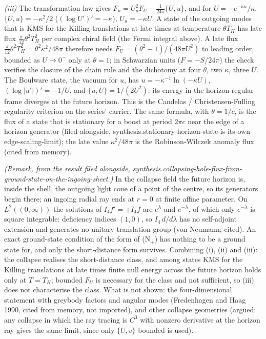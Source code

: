 \emph{(iii)} The transformation law gives $F_{u} = U_{u}^{2}F_{U} - \tfrac{1}{24\pi}\{U, u\}$, and for $U = -e^{-\kappa u}/\kappa$, $\{U, u\} = -\kappa^{2}/2$ ($(\log U')' = -\kappa$), $U_{u} = -\kappa U$. A state of the outgoing modes that is KMS for the Killing translations at late times at temperature $\theta T_{H}$ has late flux $\tfrac{\pi}{12}\theta^{2}T_{H}^{2}$ per complex chiral field (the Fermi integral above). A late flux $\tfrac{\pi}{12}\theta^{2}T_{H}^{2} = \theta^{2}\kappa^{2}/48\pi$ therefore needs $F_{U} = (\theta^{2} - 1)/(48\pi U^{2})$ to leading order, bounded as $U \to 0^{-}$ only at $\theta = 1$; in Schwarzian units ($F = -S/24\pi$) the check verifies the closure of the chain rule and the dichotomy at four $\theta$, two $\kappa$, three $U$. The Boulware state, the vacuum for $u$, has $u = -\kappa^{-1}\ln(-\kappa U)$, $(\log|u'|)' = -1/U$, and $\{u, U\} = 1/(2U^{2})$: its energy in the horizon-regular frame diverges at the future horizon. This is the Candelas / Christensen-Fulling regularity criterion on the series' carrier. The same formula, with $\theta = 1/c$, is the flux of a state that is stationary for a boost at period $2\pi c$ near the edge of a horizon generator (filed alongside, synthesis.stationary-horizon-state-is-its-own-edge-scaling-limit); the late value $\kappa^{2}/48\pi$ is the Robinson-Wilczek anomaly flux (cited from memory).

\emph{(Remark, from the result filed alongside, synthesis.collapsing-hole-flux-from-ground-state-on-the-ingoing-sheet.)} In the collapse field the future horizon is, inside the shell, the outgoing light cone of a point of the centre, so its generators begin there; an ingoing radial ray ends at $r = 0$ at finite affine parameter. On $L^{2}((0, \infty))$ the solutions of $I_{4} f' = \pm I_{4} f$ are $e^{\lambda}$ and $e^{-\lambda}$, of which only $e^{-\lambda}$ is square integrable: deficiency indices $(1, 0)$, so $I_{4}\,d/d\lambda$ has no self-adjoint extension and generates no unitary translation group (von Neumann; cited). An exact ground-state condition of the form of (N$_{+}$) has nothing to be a ground state for, and only the short-distance form survives. Combining (i), (ii) and (iii): the collapse realises the short-distance class, and among states KMS for the Killing translations at late times finite null energy across the future horizon holds only at $T = T_{H}$; bounded $F_{U}$ is necessary for the class and not sufficient, so (iii) does not characterise the class. What is not shown: the four-dimensional statement with greybody factors and angular modes (Fredenhagen and Haag 1990, cited from memory, not imported), and other collapse geometries (argued: any collapse in which the ray tracing is $C^{3}$ with nonzero derivative at the horizon ray gives the same limit, since only $\{U, v\}$ bounded is used).
